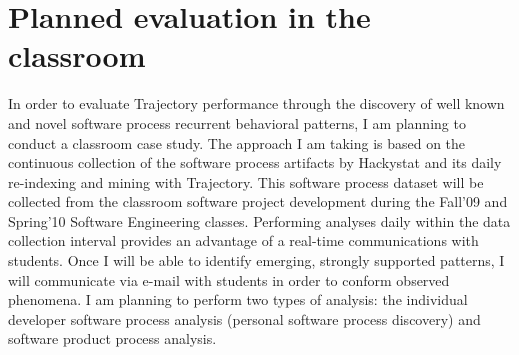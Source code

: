 \section{Planned evaluation in the classroom}\label{classroom}
In order to evaluate Trajectory performance through the discovery of well known and novel software process recurrent behavioral patterns, I am planning to conduct a classroom case study. The approach I am taking is based on the continuous collection of the software process artifacts by Hackystat and its daily re-indexing and mining with Trajectory. This software process dataset will be collected from the classroom software project development during the Fall'09 and Spring'10 Software Engineering classes. Performing analyses daily within the data collection interval provides an advantage of a real-time communications with students. Once I will be able to identify emerging, strongly supported patterns, I will communicate via e-mail with students in order to conform observed phenomena. I am planning to perform two types of analysis: the individual developer software process analysis (personal software process discovery) and software product process analysis.

